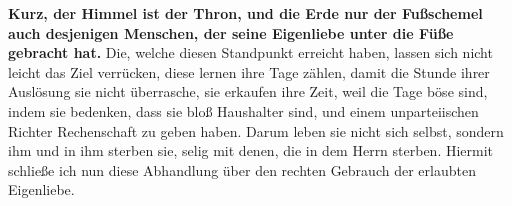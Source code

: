\medskip

\textbf{Kurz, der Himmel ist der Thron, und die Erde nur der Fußschemel auch
desjenigen
Menschen, der seine Eigenliebe unter die Füße gebracht hat.} Die, welche diesen
Standpunkt erreicht haben, lassen sich nicht leicht das Ziel verrücken, diese
lernen ihre Tage zählen, damit die Stunde ihrer Auslösung sie nicht überrasche,
sie erkaufen ihre Zeit, weil die Tage böse sind,
indem
sie bedenken, dass sie bloß Haushalter sind, und einem unparteiischen Richter
Rechenschaft zu geben haben. Darum leben sie nicht sich selbst, sondern ihm und
in ihm sterben sie, selig mit denen, die in dem Herrn sterben. Hiermit schließe
ich nun diese Abhandlung über den rechten Gebrauch der erlaubten Eigenliebe.









